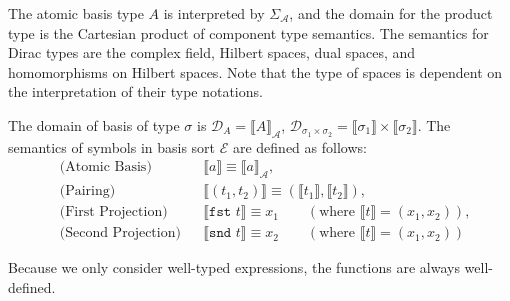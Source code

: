 \documentclass[manuscript, review, timestamp]{acmart}
\newcommand*{\fst}{\texttt{fst }}
\newcommand*{\snd}{\texttt{snd }}
\newcommand*{\sem}[1]{{\llbracket #1 \rrbracket}}
\begin{document}
The atomic basis type $A$ is interpreted by $\Sigma_\mathcal{A}$, and the domain for the product type is the Cartesian product of component type semantics. The semantics for Dirac types are the complex field, Hilbert spaces, dual spaces, and homomorphisms on Hilbert spaces. Note that the type of spaces is dependent on the interpretation of their type notations.

\begin{definition}
  The domain of basis of type $\sigma$ is $\mathcal{D}_A = \sem{A}_\mathcal{A}$, $\mathcal{D}_{\sigma_1 \times \sigma_2} = \sem{\sigma_1} \times \sem{\sigma_2}$.
  The semantics of symbols in basis sort $\mathcal{E}$ are defined as follows:
  \begin{align*}
    & \text{(Atomic Basis)} && \sem{a} \equiv \sem{a}_\mathcal{A}, \\
    & \text{(Pairing)} &&
    \sem{(t_1, t_2)} \equiv (\sem{t_1}, \sem{t_2}), \\
    & \text{(First Projection)} &&
    \sem{\fst t} \equiv x_1 \qquad (\text{where } \sem{t} = (x_1, x_2)), \\
    & \text{(Second Projection)} &&
    \sem{\snd t} \equiv x_2 \qquad (\text{where } \sem{t} = (x_1, x_2))
  \end{align*}
\end{definition}

Because we only consider well-typed expressions, the functions are always well-defined.


\end{document}
